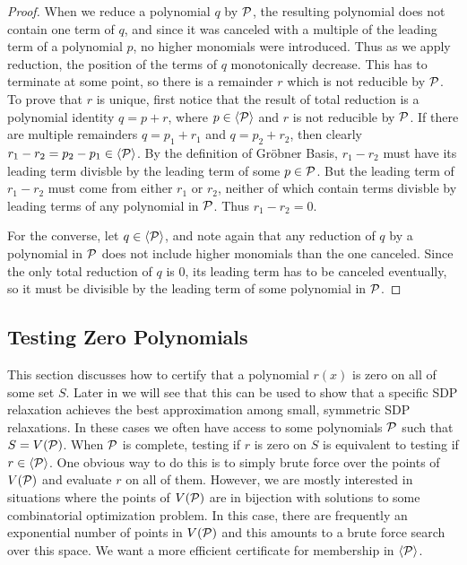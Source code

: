 \begin{proof}
When we reduce a polynomial $q$ by $\mathcal P$, the resulting polynomial does not contain one term of $q$, and since it was canceled with a multiple of the leading term of a polynomial $p$, no higher monomials were introduced. Thus as we apply reduction, the position of the terms of $q$ monotonically decrease. This has to terminate at some point, so there is a remainder $r$ which is not reducible by $\mathcal P$. To prove that $r$ is unique, first notice that the result of total reduction is a polynomial identity $q = p + r$, where $p \in \langle \mathcal P \rangle$ and $r$ is not reducible by $\mathcal P$. If there are multiple remainders $q = p_1 + r_1$ and $q = p_2 + r_2$, then clearly $r_1 - r_2 = p_2 - p_1 \in \langle \mathcal P \rangle$. By the definition of Gr\"obner Basis, $r_1 - r_2$ must have its leading term divisble by the leading term of some $p \in \mathcal P$. But the leading term of $r_1 - r_2$ must come from either $r_1$ or $r_2$, neither of which contain terms divisble by leading terms of any polynomial in $\mathcal P$. Thus $r_1 - r_2 = 0$.

For the converse, let $q \in \langle \mathcal P \rangle$, and note again that any reduction of $q$ by a polynomial in $\mathcal P$ does not include higher monomials than the one canceled. Since the only total reduction of $q$ is $0$, its leading term has to be canceled eventually, so it must be divisible by the leading term of some polynomial in $\mathcal P$.
\end{proof}

\subsection{Testing Zero Polynomials}

This section discusses how to certify that a polynomial $r(x)$ is zero on all of some set $S$. Later in  we will see that this can be used to show that a specific SDP relaxation achieves the best approximation among small, symmetric SDP relaxations. 
In these cases we often have access to some polynomials $\mathcal P$ such that $S = V(\mathcal P)$.
When $\mathcal P$ is complete, testing if $r$ is zero on $S$ is equivalent to testing if $r \in \langle \mathcal P \rangle$.
One obvious way to do this is to simply brute force over the points of $V(\mathcal P)$ and evaluate $r$ on all of them. 
However, we are mostly interested in situations where the points of $V(\mathcal P)$ are in bijection with solutions to some combinatorial optimization problem.
In this case, there are frequently an exponential number of points in $V(\mathcal P)$ and this amounts to a brute force search over this space. 
We want a more efficient certificate for membership in $\langle \mathcal P \rangle$. 

